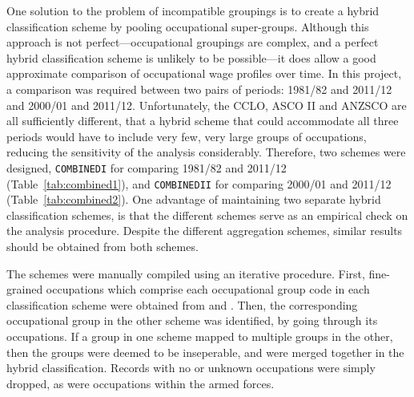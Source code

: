 One solution to the problem of incompatible groupings is to create a hybrid classification scheme by pooling occupational super-groups. Although this approach is not perfect---occupational groupings are complex, and a perfect hybrid classification scheme is unlikely to be possible---it does allow a good approximate comparison of occupational wage profiles over time. In this project, a comparison was required between two pairs of periods: 1981/82 and 2011/12 and 2000/01 and 2011/12. Unfortunately, the CCLO, ASCO II and ANZSCO are all sufficiently different, that a hybrid scheme that could accommodate all three periods would have to include very few, very large groups of occupations, reducing the sensitivity of the analysis considerably. Therefore, two schemes were designed, {\tt COMBINEDI} for comparing 1981/82 and 2011/12 (Table~\ref{tab:combined1}), and {\tt COMBINEDII} for comparing 2000/01 and 2011/12 (Table~\ref{tab:combined2}). One advantage of maintaining two separate hybrid classification schemes, is that the different schemes serve as an empirical check on the analysis procedure. Despite the different aggregation schemes, similar results should be obtained from both schemes.

The schemes were manually compiled using an iterative procedure. First, fine-grained occupations which comprise each occupational group code in each classification scheme were obtained from \citep{Castles1986} and \citep{Trewin2006}. Then, the corresponding occupational group in the other scheme was identified, by going through its occupations. If a group in one scheme mapped to multiple groups in the other, then the groups were deemed to be inseperable, and were merged together in the hybrid classification. Records with no or unknown occupations were simply dropped, as were occupations within the armed forces.

